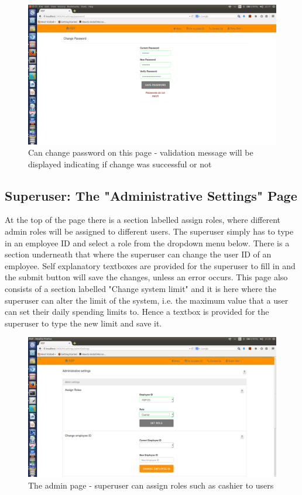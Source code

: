 \documentclass[a4paper,12pt]{article}
\begin{document}
\begin{figure}[H]
  \centering
    \includegraphics[width=1.0\textwidth]{screenshots/changePassDontMatch.png}
    \caption{Can change password on this page - validation message will be displayed indicating if change was successful or not} 
\end{figure}

\subsection{Superuser: The "Administrative Settings" Page} 
At the top of the page there is a section labelled assign roles, where different admin roles will be assigned to different users. The superuser simply has to type in an employee ID and select a role from the dropdown menu below. There is a section underneath that where the superuser can change the user ID of an employee. Self explanatory textboxes are provided for the superuser to fill in and the submit button will save the changes, unless an error occurs.  This page also consists of a section labelled "Change system limit" and it is here where the superuser can alter the limit of the system, i.e. the maximum value that a user can set their daily spending limits to. Hence a textbox is provided for the superuser to type the new limit and save it.

\begin{figure}[H]
  \centering
    \includegraphics[width=1.0\textwidth]{screenshots/assignRole.png}
    \caption{The admin page - superuser can assign roles such as cashier to users} 
\end{figure}
\end{document}
